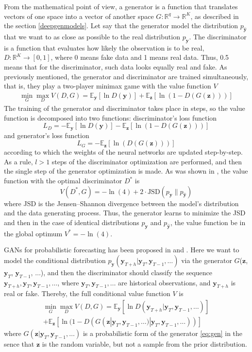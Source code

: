 \documentclass[12pt,a4paper]{article}
\begin{document}
From the mathematical point of view, a generator is a function that translates vectors of one space into a vector of another space $G: \mathbb R^q \to \mathbb R^K$, as described in the section \ref{deepgenmodels}. Let say that the generator model the distribution $p_\mathbf{\hat y}$ that we want to as close as possible to the real distribution $p_\mathbf y$. The discriminator is a function that evaluates how likely the observation is to be real, $D: \mathbb R^K \to [0, 1]$, where 0 means fake data and 1 means real data. Thus, 0.5 means that for the discriminator, such data looks equally real and fake. As previously mentioned, the generator and discriminator are trained simultaneously, that is, they play a two-player minimax game with the value function $V$
$$\begin{aligned}
\min _{G} \max _{D} V(D, G) =\mathbb{E}_\mathbf{y}[\ln D(\mathbf{y})]+ \mathbb{E}_\mathbf{z}[\ln (1-D(G(\mathbf{z})))]
\end{aligned}$$
The training of the generator and discriminator takes place in steps, so the value function is decomposed into two functions: discriminator's loss function 
$$L_D = -\mathbb{E}_\mathbf{y}[\ln D(\mathbf{y})] - \mathbb{E}_{\mathbf{z}}[\ln (1-D(G(\mathbf{z})))]$$
and generator's loss function
$$L_G = -\mathbb{E}_{\mathbf{z}}[\ln (D(G(\mathbf{z})))]$$
according to which the weights of the neural networks are updated step-by-step. As a rule, $l>1$ steps of the discriminator optimization are performed, and then the single step of the generator optimization is made.  As was shown in \cite{goodfellow2014}, the value function with the optimal discriminator $D^*$ is 
$$V(D^*, G)=-\ln (4)+2 \cdot \text{JSD}(p_\mathbf{y} \| p_\mathbf{\hat y} )$$
where JSD is the Jensen–Shannon divergence between the model’s distribution and the data generating process. Thus, the generator learns to minimize the JSD and then in the case of identical distributions $p_\mathbf{y}$ and $p_\mathbf{\hat y}$, the value function be in the global optimum $V^* = - \ln (4)$.

GANs for probabilistic forecasting has been proposed in \cite{koshiyama2019generative} and \cite{koochali2020like}. Here we want to model the conditional distribution $p_\mathbf y(\mathbf y_{T+h}|\mathbf{y}_{T}, \mathbf{y}_{T-1}, \dots)$ via the generator $G$($\mathbf z$, $\mathbf{y}_{T}$, $\mathbf{y}_{T-1}$, $\dots$), and then the discriminator should classify the sequence $\mathbf y_{T+h}, \mathbf{y}_{T}, \mathbf{y}_{T-1}, \dots$, where $\mathbf{y}_{T}, \mathbf{y}_{T-1}, \dots$ are historical observations, and $\mathbf y_{T+h}$ is real or fake. Thereby, the full conditional value function $V$ is 
$$
\begin{aligned}
\min _{G} \max _{D} V(D, G) =\mathbb{E}_\mathbf{y}[\ln D(\mathbf y_{T+h} | \mathbf{y}_{T}, \mathbf{y}_{T-1}, \dots)]\\
+ \mathbb{E}_\mathbf{z}[\ln (1-D(G(\mathbf z | \mathbf{y}_{T}, \mathbf{y}_{T-1}, \dots) | \mathbf{y}_{T}, \mathbf{y}_{T-1}, \dots))]    
\end{aligned}
$$
where $G(\mathbf z | \mathbf{y}_{T}, \mathbf{y}_{T-1}, \dots)$ is a probabilistic form of the generator \eqref{eq:gen} in the sence that $\mathbf z$ is the random variable, but not a sample from the prior distribution.
\end{document}
